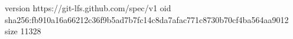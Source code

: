 version https://git-lfs.github.com/spec/v1
oid sha256:fb910a16a66212c36f9b5ad7b7fc14c8da7afac771c8730b70cf4ba564aa9012
size 11328
